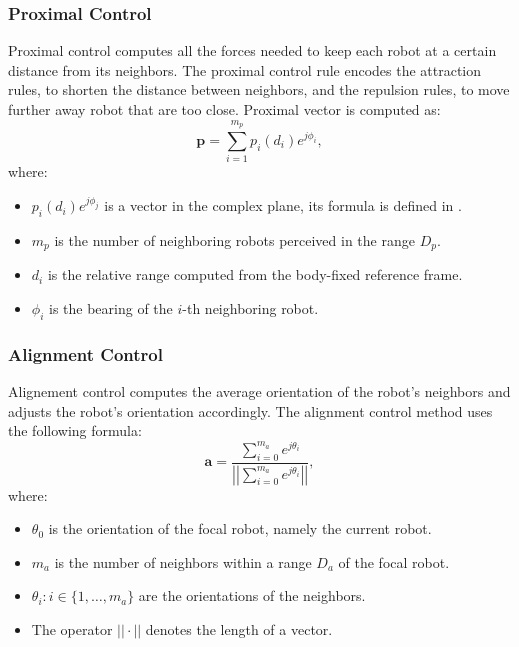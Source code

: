 \documentclass[../../Thesis.tex]{subfiles}
\begin{document}
			\subsubsection{Proximal Control}
				Proximal control computes all the forces needed to keep each robot at a certain distance from its neighbors. The proximal control rule encodes the attraction rules, to shorten the distance between neighbors, and the repulsion rules, to move further away robot that are too close. Proximal vector is computed as:
				\[\mathbf{p} = \sum\limits_{i = 1}^{m_p} p_i(d_i) e^{j \phi_i},\]
				where:
				\begin{itemize}
					\item $p_i(d_i) e^{j \phi_j}$ is a vector in the complex plane, its formula is defined in \citep{Ferrante2012}.
					\item $m_p$ is the number of neighboring robots perceived in the range $D_p$.
					\item $d_i$ is the relative range computed from the body-fixed reference frame.
					\item $\phi_i$ is the bearing of the $i$-th neighboring robot.
				\end{itemize}
			\subsubsection{Alignment Control}
				Alignement control computes the average orientation of the robot's neighbors and adjusts the robot's orientation accordingly. The alignment control method uses the following formula:
				\[\mathbf{a} = \frac{\sum\limits_{i=0}^{m_a} e^{j\theta_i}}{\left| \left| \sum\limits_{i=0}^{m_a} e^{j \theta_i}\right|\right|},\]
				where:
				\begin{itemize}
					\item $\theta_0$ is the orientation of the focal robot, namely the current robot.
					\item $m_a$ is the number of neighbors within a range $D_a$ of the focal robot.
					\item $\theta_i : i \in \lbrace 1, \dots, m_a \rbrace$ are the orientations of the neighbors.
					\item The operator $|| \cdot ||$ denotes the length of a vector.
				\end{itemize}
			
\end{document}
